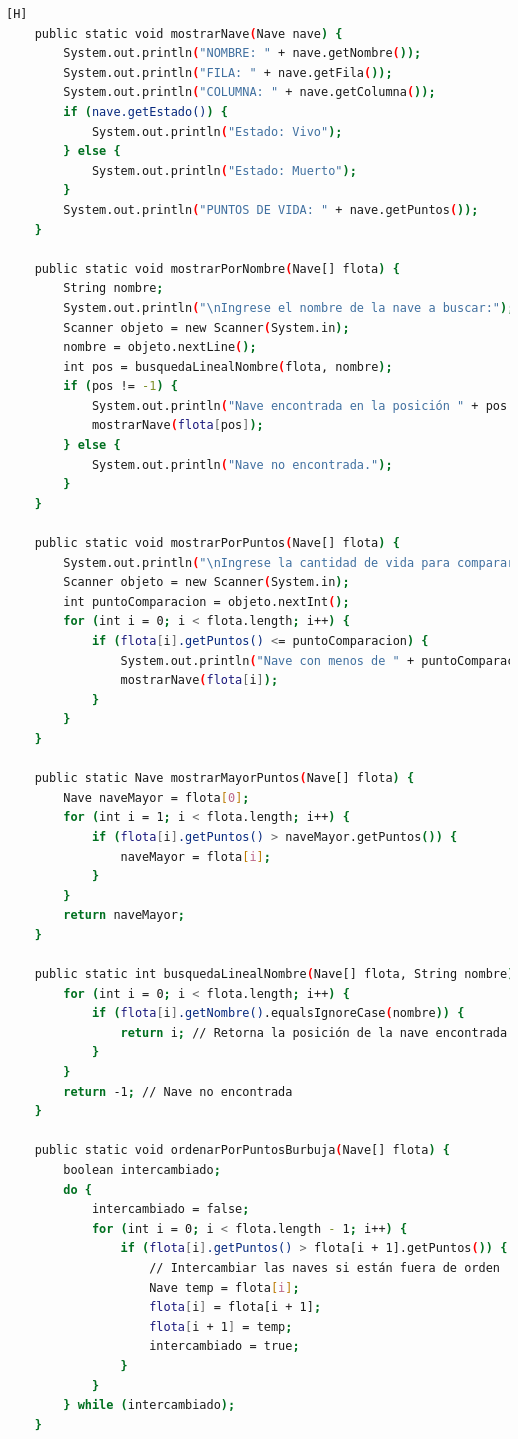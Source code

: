 \documentclass{article}
\begin{document}
\begin{lstlisting}[language=bash,caption={Creando la clase Ejercito_vs}][H]
    public static void mostrarNave(Nave nave) {
        System.out.println("NOMBRE: " + nave.getNombre());
        System.out.println("FILA: " + nave.getFila());
        System.out.println("COLUMNA: " + nave.getColumna());
        if (nave.getEstado()) {
            System.out.println("Estado: Vivo");
        } else {
            System.out.println("Estado: Muerto");
        }
        System.out.println("PUNTOS DE VIDA: " + nave.getPuntos());
    }

    public static void mostrarPorNombre(Nave[] flota) {
        String nombre;
        System.out.println("\nIngrese el nombre de la nave a buscar:");
        Scanner objeto = new Scanner(System.in);
        nombre = objeto.nextLine();
        int pos = busquedaLinealNombre(flota, nombre);
        if (pos != -1) {
            System.out.println("Nave encontrada en la posición " + pos + ":");
            mostrarNave(flota[pos]);
        } else {
            System.out.println("Nave no encontrada.");
        }
    }

    public static void mostrarPorPuntos(Nave[] flota) {
        System.out.println("\nIngrese la cantidad de vida para comparar:");
        Scanner objeto = new Scanner(System.in);
        int puntoComparacion = objeto.nextInt();
        for (int i = 0; i < flota.length; i++) {
            if (flota[i].getPuntos() <= puntoComparacion) {
                System.out.println("Nave con menos de " + puntoComparacion + " puntos de vida:");
                mostrarNave(flota[i]);
            }
        }
    }

    public static Nave mostrarMayorPuntos(Nave[] flota) {
        Nave naveMayor = flota[0];
        for (int i = 1; i < flota.length; i++) {
            if (flota[i].getPuntos() > naveMayor.getPuntos()) {
                naveMayor = flota[i];
            }
        }
        return naveMayor;
    }

    public static int busquedaLinealNombre(Nave[] flota, String nombre) {
        for (int i = 0; i < flota.length; i++) {
            if (flota[i].getNombre().equalsIgnoreCase(nombre)) {
                return i; // Retorna la posición de la nave encontrada
            }
        }
        return -1; // Nave no encontrada
    }

    public static void ordenarPorPuntosBurbuja(Nave[] flota) {
        boolean intercambiado;
        do {
            intercambiado = false;
            for (int i = 0; i < flota.length - 1; i++) {
                if (flota[i].getPuntos() > flota[i + 1].getPuntos()) {
                    // Intercambiar las naves si están fuera de orden
                    Nave temp = flota[i];
                    flota[i] = flota[i + 1];
                    flota[i + 1] = temp;
                    intercambiado = true;
                }
            }
        } while (intercambiado);
    }


\end{lstlisting}
\end{document}

